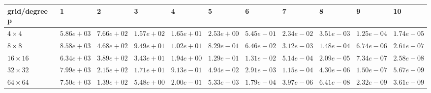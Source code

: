\begin{tabular}{lllllllllll}
\hline
 grid/degree p   & 1          & 2          & 3          & 4          & 5          & 6          & 7          & 8          & 9          & 10         \\
\hline
 $4 \times 4$    & $5.86e+03$ & $7.66e+02$ & $1.57e+02$ & $1.65e+01$ & $2.53e+00$ & $5.45e-01$ & $2.34e-02$ & $3.51e-03$ & $1.25e-04$ & $1.74e-05$ \\
 $8 \times 8$    & $8.58e+03$ & $4.68e+02$ & $9.49e+01$ & $1.02e+01$ & $8.29e-01$ & $6.46e-02$ & $3.12e-03$ & $1.48e-04$ & $6.74e-06$ & $2.61e-07$ \\
 $16 \times 16$  & $6.34e+03$ & $3.89e+02$ & $3.43e+01$ & $1.94e+00$ & $1.29e-01$ & $1.31e-02$ & $5.14e-04$ & $2.09e-05$ & $7.34e-07$ & $2.58e-08$ \\
 $32 \times 32$  & $7.99e+03$ & $2.15e+02$ & $1.71e+01$ & $9.13e-01$ & $4.94e-02$ & $2.91e-03$ & $1.15e-04$ & $4.30e-06$ & $1.50e-07$ & $5.67e-09$ \\
 $64 \times 64$  & $7.50e+03$ & $1.39e+02$ & $5.48e+00$ & $2.00e-01$ & $5.33e-03$ & $1.79e-04$ & $3.97e-06$ & $6.41e-08$ & $2.32e-09$ & $3.61e-09$ \\
\hline
\end{tabular}